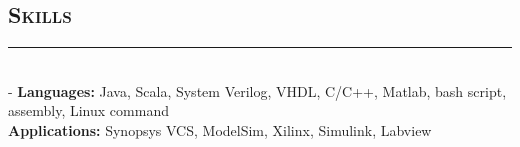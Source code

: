 \documentclass[11pt]{res}
\newcommand{\style}[1]{\color{Blue}\large\textsc{#1}}
\begin{document}
\begin{resume}
\section{\style{Skills}}
\vspace{-10pt}
\rule{18cm}{0.5mm}\\
 -\sectionwidth \resumewidth
 \textbf{Languages:}  Java, Scala, System Verilog, VHDL, C/C++, Matlab, bash script, assembly, Linux command    \hfill \vspace{-0.5mm}\\
  \textbf{Applications:} Synopsys VCS,  ModelSim, Xilinx, Simulink, Labview\\%

   
   
   \vspace{-25pt}

\end{resume}
\end{document}
